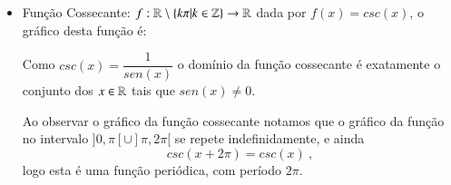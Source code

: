 \begin{itemize}
  
  Lembramos que $tan(x)= \frac{sen(x)}{cos(x)}$, logo podemos entender o domínio da função tangente como o conjunto dos $x \in \R$ tais que $cos(x) \neq 0$.
  
  Note que o comportamento do gráfico da função tangente no intervalo $]-\frac{\pi}{2}, \frac{\pi}{2}[$ se repete indefinadamente, e ainda
  \[tan(x)= tan(x + \pi)\]
  donde concluímos que a função tangente é uma função períodica de período $\pi$.

  \item Função Cossecante: $f: \mathbb{R} \setminus \{ k\pi | k \in \mathbb{Z}\} \rightarrow \mathbb{R}$ dada por $f(x)= csc(x)$, o gráfico desta função é: 

  
  Como $csc(x)= \dfrac{1}{sen (x)}$ o domínio da função cossecante é exatamente o conjunto dos $x \in \R$ tais que $sen(x) \neq 0$.
  
  Ao observar o gráfico da função cossecante notamos que o gráfico da função no intervalo $]0, \pi[ \cup ] \pi, 2 \pi[$ se repete indefinidamente, e ainda
  \[csc(x + 2\pi)= csc(x) \ , \]
  logo esta é uma função periódica, com período $2\pi$.


\end{itemize}
